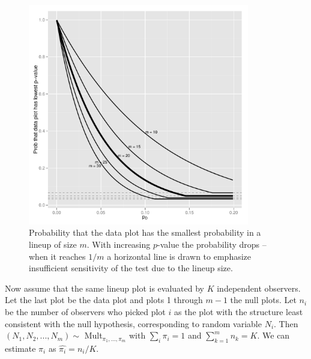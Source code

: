 \documentclass{article}
\newcommand{\green}[1]{{\color{green} #1}} %
\begin{document}

\begin{figure}[htbp] %
   \centering
   \includegraphics[width=3.8in]{images/powerplot.pdf} 
   \caption{Probability that the data plot has the smallest probability in a lineup of size $m$. With increasing $p$-value the probability drops -- when it reaches $1/m$ a horizontal line is drawn to emphasize insufficient sensitivity of the test due to the lineup size. 
}
   \label{fig:pval_power}
\end{figure}

Now assume that the same lineup plot is evaluated by $K$ independent observers. %
Let the last plot be the data plot and plots 1 through $m-1$ the null plots. Let $n_i$ be the number of observers who picked plot $i$ as the plot with the structure least consistent with the null hypothesis, corresponding to random variable $N_i$.  Then  $(N_1, N_2, ..., N_m) \sim$ Mult$_{\pi_1, ..., \pi_m}$ with $\sum_i \pi_i = 1$ and $\sum_{k=1}^{m} n_k = K$. We can estimate $\pi_i$ as $\widehat{\pi_i} = n_i/K$. 
\end{document}
